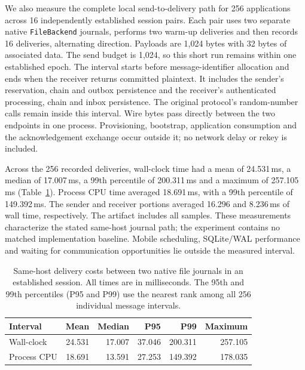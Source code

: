\documentclass[pdflatex]{sn-jnl}
\theoremstyle{thmstyleone}
\theoremstyle{thmstylethree}
\theoremstyle{thmstyletwo}
\begin{document}
We also measure the complete local send-to-delivery path for 256
applications across 16 independently established session pairs. Each pair
uses two separate native \texttt{FileBackend} journals, performs two warm-up
deliveries and then records 16 deliveries, alternating direction. Payloads
are 1,024 bytes with 32 bytes of associated data. The send budget is 1,024,
so this short run remains within one established epoch.
The interval starts before message-identifier allocation and ends when the
receiver returns committed plaintext. It includes the sender's reservation,
chain and outbox persistence and the receiver's authenticated processing,
chain and inbox persistence. The original protocol's random-number calls
remain inside this interval. Wire bytes pass directly between the two
endpoints in one process. Provisioning, bootstrap, application consumption
and the acknowledgement exchange occur outside it; no network delay or
rekey is included.

Across the 256 recorded deliveries, wall-clock time had a mean of
24.531\,ms, a median of 17.007\,ms, a 99th percentile of 200.311\,ms
and a maximum of 257.105\,ms (Table~\ref{tab:delivery-latency}).
Process CPU time averaged 18.691\,ms, with a 99th percentile of
149.392\,ms. The sender and receiver portions averaged 16.296 and
8.236\,ms of wall time, respectively. The artifact includes all samples.
These measurements characterize the stated same-host journal path;
the experiment contains no matched implementation baseline. Mobile
scheduling, SQLite/WAL performance and waiting for communication
opportunities lie outside the measured interval.

\begin{table}[t]
\centering
\small
\caption{Same-host delivery costs between two native file journals in an
established session. All times are in milliseconds. The 95th and 99th
percentiles (P95 and P99) use the nearest rank among all 256 individual
message intervals.}
\label{tab:delivery-latency}
\begin{tabularx}{\linewidth}{@{}Xrrrrr@{}}
\toprule
Interval & Mean & Median & P95 & P99 & Maximum\\
\midrule
Wall-clock & 24.531 & 17.007 & 37.046 & 200.311 & 257.105\\
Process CPU & 18.691 & 13.591 & 27.253 & 149.392 & 178.035\\
\bottomrule
\end{tabularx}
\end{table}
\end{document}

